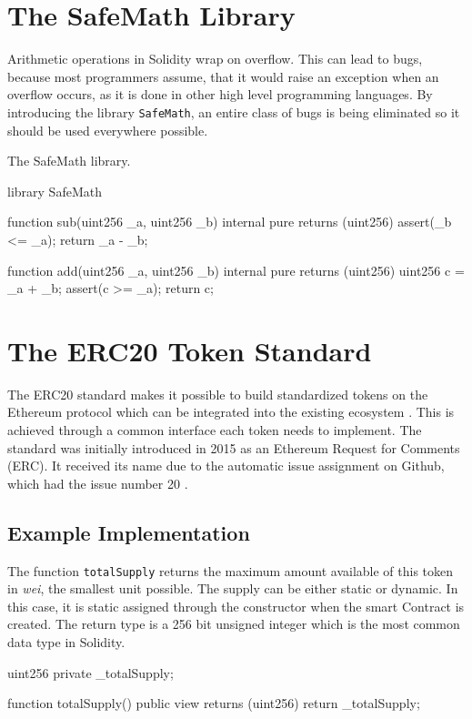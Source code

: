 \section{The SafeMath Library}
Arithmetic operations in Solidity wrap on overflow. This can lead to bugs, because most programmers assume, that it would raise an exception when an overflow occurs, as it is done in other high level programming languages. By introducing the library \texttt{SafeMath}, an entire class of bugs is being eliminated so it should be used everywhere possible.

\begin{program}
\caption{The SafeMath library.}
\label{prog:SafeMath}
\begin{GenericCode}
library SafeMath {
  function sub(uint256 _a, uint256 _b) internal pure returns (uint256) {
    assert(_b <= _a);
    return _a - _b;
  }

  function add(uint256 _a, uint256 _b) internal pure returns (uint256) {
    uint256 c = _a + _b;
    assert(c >= _a);
    return c;
  }
}
\end{GenericCode}
\end{program}

\section{The ERC20 Token Standard}
\label{sec:ERC20}
The ERC20 standard makes it possible to build standardized tokens on the Ethereum protocol which can be integrated into the existing ecosystem \cite{ERC20}. This is achieved through a common interface each token needs to implement. The standard was initially introduced in 2015 as an Ethereum Request for Comments (ERC). It received its name due to the automatic issue assignment on Github, which had the issue number 20 \cite{AntonopoulosWood2018} \cite{BadrHorrocksWu2018}.

\subsection{Example Implementation}
The function \texttt{totalSupply} returns the maximum amount available of this token in \textit{wei}, the smallest unit possible. The supply can be either static or dynamic. In this case, it is static assigned through the constructor when the smart Contract is created. The return type is a 256 bit unsigned integer which is the most common data type in Solidity.

\begin{GenericCode}
 uint256 private _totalSupply;
  
 function totalSupply() public view returns (uint256) {
   return _totalSupply;
 }	
\end{GenericCode}

